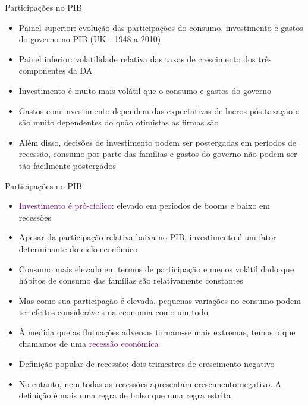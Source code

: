 \documentclass[10pt]{beamer}
\begin{document}
\begin{frame}{Participações no PIB}
    \begin{itemize}
        \item Painel superior: evolução das participações do consumo, investimento e gastos do governo no PIB (UK - 1948 a 2010)\bigskip
         
        \item Painel inferior: volatilidade relativa das taxas de crescimento dos três componentes da DA\bigskip
         
        \item Investimento é muito mais volátil que o consumo e gastos do governo\bigskip
         
        \item Gastos com investimento dependem das expectativas de lucros pós-taxação e são muito dependentes do quão otimistas as firmas são\bigskip
         
        \item Além disso, decisões de investimento podem ser postergadas em períodos de recessão, consumo por parte das famílias e gastos do governo não podem ser tão facilmente postergados
    \end{itemize}
\end{frame}

\begin{frame}{Participações no PIB}
    \begin{itemize}
        \item \textcolor{purple}{Investimento é pró-cíclico}: elevado em períodos de booms e baixo em recessões\bigskip
         
        \item Apesar da participação relativa baixa no PIB, investimento é um fator determinante do ciclo econômico\bigskip
         
        \item Consumo mais elevado em termos de participação e menos volátil dado que hábitos de consumo das famílias são relativamente constantes\bigskip
         
        \item Mas como sua participação é elevada, pequenas variações no consumo podem ter efeitos consideráveis na economia como um todo\bigskip
         
        \item À medida que as flutuações adversas tornam-se mais extremas, temos o que chamamos de uma \textcolor{purple}{recessão econômica}\bigskip
         
        \item Definição popular de recessão: dois trimestres de crescimento negativo\bigskip
         
        \item No entanto, nem todas as recessões apresentam crescimento negativo. A definição é mais uma regra de bolso que uma regra estrita
    \end{itemize}
\end{frame}
\end{document}
